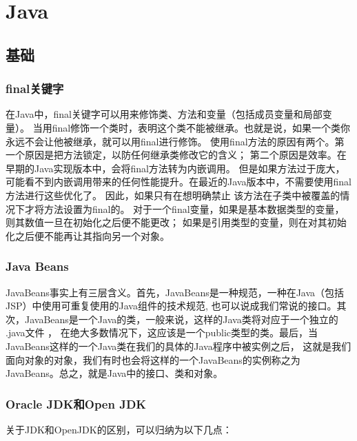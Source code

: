 \documentclass{book}
\begin{document}
\chapter{Java}

\section{基础}

\subsection{final关键字}

在Java中，final关键字可以用来修饰类、方法和变量（包括成员变量和局部变量）。
当用final修饰一个类时，表明这个类不能被继承。也就是说，如果一个类你永远不会让他被继承，就可以用final进行修饰。
使用final方法的原因有两个。第一个原因是把方法锁定，以防任何继承类修改它的含义；
第二个原因是效率。在早期的Java实现版本中，会将final方法转为内嵌调用。
但是如果方法过于庞大，可能看不到内嵌调用带来的任何性能提升。在最近的Java版本中，不需要使用final方法进行这些优化了。
因此，如果只有在想明确禁止 该方法在子类中被覆盖的情况下才将方法设置为final的。
对于一个final变量，如果是基本数据类型的变量，则其数值一旦在初始化之后便不能更改；
如果是引用类型的变量，则在对其初始化之后便不能再让其指向另一个对象。

\subsection{Java Beans}

JavaBeans事实上有三层含义。首先，JavaBeans是一种规范，一种在Java（包括JSP）中使用可重复使用的Java组件的技术规范,
也可以说成我们常说的接口。其次，JavaBeans是一个Java的类，一般来说，这样的Java类将对应于一个独立的 .java文件 ，
在绝大多数情况下，这应该是一个public类型的类。最后，当JavaBeans这样的一个Java类在我们的具体的Java程序中被实例之后，
这就是我们面向对象的对象，我们有时也会将这样的一个JavaBeans的实例称之为JavaBeans。总之，就是Java中的接口、类和对象。

\subsection{Oracle JDK和Open JDK}

关于JDK和OpenJDK的区别，可以归纳为以下几点：
\end{document}
